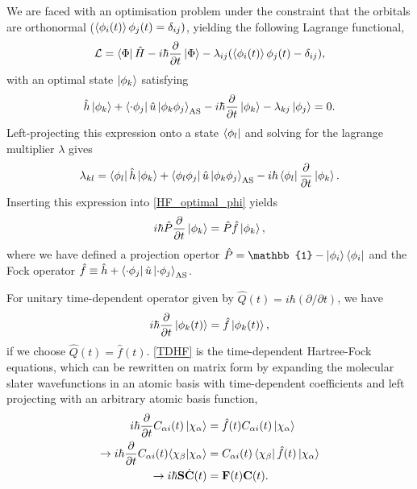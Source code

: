 \documentclass[aip,jcp,reprint,floatfix]{revtex4-1}
\begin{document}
\begin{appendices}
We are faced with an optimisation problem under the constraint that the orbitals are orthonormal ($\braket{\phi_i(t)}{\phi_j(t)} = \delta_{ij})$, yielding the following Lagrange functional,
\begin{equation}
    \mathcal{L} = \bra{\Phi} \hat{H} - i\hbar \frac{\partial}{\partial t} \ket{\Phi} 
    - \lambda_{ij}(\braket{\phi_i(t)}{\phi_j(t)} - \delta_{ij}),
\end{equation}
with an optimal state $\ket{\phi_k}$ satisfying
\begin{equation}
    \label{HF_optimal_phi}
    \hat{h}\ket{\phi_k} + \bra{\cdot \phi_j} \hat{u} \ket{\phi_k \phi_j}_{\text{AS}} 
    - i\hbar\frac{\partial}{\partial t} \ket{\phi_k} - \lambda_{kj} \ket{\phi_j} = 0.
\end{equation}
Left-projecting this expression onto a state $\bra{\phi_l}$ and solving for the lagrange multiplier $\lambda$ gives
\begin{equation}
    \lambda_{kl} = \bra{\phi_l} \hat{h} \ket{\phi_k} 
    + \bra{\phi_l \phi_j} \hat{u} \ket{\phi_k \phi_j}_{\text{AS}}
    - i\hbar \bra{\phi_l} \frac{\partial}{\partial t} \ket{\phi_k}.
\end{equation}
Inserting this expression into \autoref{HF_optimal_phi} yields
\begin{equation}
    i\hbar \hat{P}\frac{\partial}{\partial t} \ket{\phi_k} = \hat{P} \hat{f} \ket{\phi_k},
\end{equation}
where we have defined a projection opertor $\hat{P} = \mathbb{1} - \ket{\phi_i}\bra{\phi_i}$ and the Fock operator $\hat{f} \equiv \hat{h} + \bra{\cdot \phi_j} \hat{u} \ket{\cdot \phi_j}_{\text{AS}}$.

For unitary time-dependent operator given by $\hat{Q}(t) = i\hbar (\partial / \partial t)$,
we have
\begin{equation}
    \label{TDHF}
    i \hbar \frac{\partial}{\partial t} \ket{\phi_k(t)} = \hat{f} \ket{\phi_k(t)},
\end{equation}
if we choose $\hat{Q}(t) = \hat{f}(t)$. \autoref{TDHF} is the time-dependent Hartree-Fock equations, which can be rewritten on matrix form by expanding the molecular slater wavefunctions in an atomic basis with time-dependent coefficients and left projecting with an arbitrary atomic basis function,
\begin{align}
    i \hbar \frac{\partial}{\partial t} C_{\alpha i} (t) \ket{\chi_\alpha} &= \hat{f}(t) C_{\alpha i} (t) \ket{\chi_\alpha} \\
    \to i \hbar \frac{\partial}{\partial t} C_{\alpha i} (t) \langle{\chi_{\beta}}|{\chi_{\alpha}}\rangle &= C_{\alpha i}(t) \bra{\chi_\beta} \hat{f}(t) \ket{\chi_\alpha} \\
    \to i \hbar \mathbf{S}\dot{\mathbf{C}}(t) &= \mathbf{F}(t) \mathbf{C}(t).
\end{align}

\end{appendices}
\end{document}
